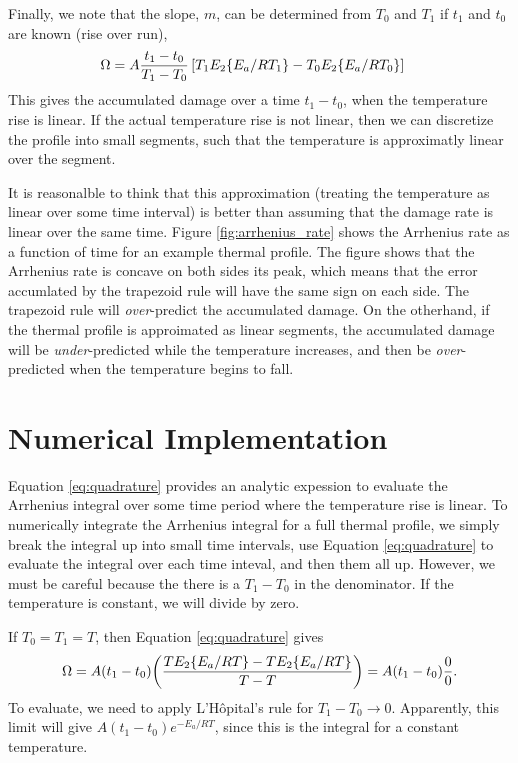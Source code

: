 \documentclass{article}
\begin{document}
Finally, we note that the slope, $m$, can be determined from $T_0$ and $T_1$ if $t_1$ and $t_0$ are known (rise over run),
\begin{align}
  \label{eq:quadrature}
  \Omega &= A \frac{t_1 - t_0}{T_1 - T_0}              \left[T_1 E_2\qty{E_a/RT_1}              - T_0 E_2\qty{E_a/RT_0}             \right]
\end{align}
This gives the accumulated damage over a time $t_1 - t_0$, when the temperature rise is linear. If the actual
temperature rise is not linear, then we can discretize the profile into small segments, such that
the temperature is approximatly linear over the segment.

It is reasonalble to think that this approximation
(treating the temperature as linear over some time interval) is better than assuming that the damage rate
is linear over the same time. Figure \ref{fig:arrhenius_rate} shows the Arrhenius rate as a function of time for an example
thermal profile. The figure shows that the Arrhenius rate is concave on both sides its peak, which means that the error accumlated by the
trapezoid rule will have the same sign on each side. The trapezoid rule will \emph{over}-predict the accumulated damage. On the otherhand,
if the thermal profile is approimated as linear segments, the accumulated damage will be \emph{under}-predicted while the temperature increases, and
then be \emph{over}-predicted when the temperature begins to fall.

\section{Numerical Implementation}

Equation \ref{eq:quadrature} provides an analytic expession to evaluate the Arrhenius integral over some time period where the temperature rise is linear. To numerically integrate
the Arrhenius integral for a full thermal profile, we simply break the integral up into small time intervals, use Equation \ref{eq:quadrature} to evaluate the integral over each
time inteval, and then them all up. However, we must be careful because the there is a $T_1 - T_0$ in the denominator. If the temperature is constant, we will divide by zero.

If $T_0 = T_1 = T$, then Equation \ref{eq:quadrature} gives
\begin{align}
  \Omega = A(t_1 - t_0)\qty( \frac{ T E_2\qty{E_a/RT} - T E_2\qty{E_a/RT} } { T - T} ) = A(t_1 - t_0) \frac{0}{0}.
\end{align}
To evaluate, we need to apply L'H\^{o}pital's rule for $T_1 - T_0 \rightarrow 0$. Apparently, this limit will give $A(t_1 - t_0) e^{-E_a/RT}$, since this is the integral for a constant temperature.
\end{document}
